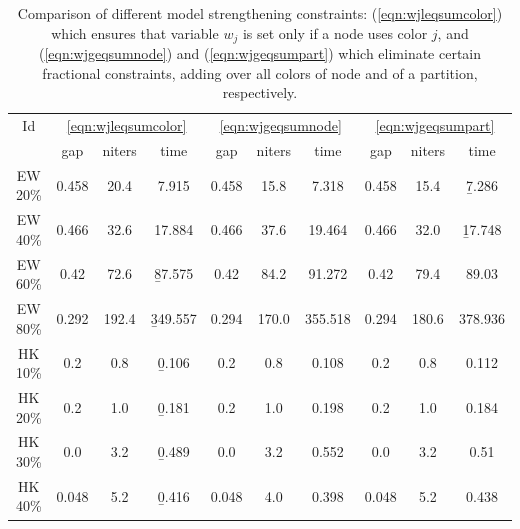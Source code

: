 \begin{table}
\label{table:models:colorbound}
\centering

\begin{tabular}{|c|ccc|ccc|ccc|}
\hline
\multicolumn{1}{|c|}{Id} & \multicolumn{3}{|c|}{\ref{eqn:wjleqsumcolor}} & \multicolumn{3}{|c|}{\ref{eqn:wjgeqsumnode}} & \multicolumn{3}{|c|}{\ref{eqn:wjgeqsumpart}}
\\
 & gap & niters & time & gap & niters & time & gap & niters & time
\\
\hline
EW 20\% & 0.458 & 20.4 & 7.915 & 0.458 & 15.8 & 7.318 & 0.458 & 15.4 & \b{7.286}
\\
EW 40\% & 0.466 & 32.6 & 17.884 & 0.466 & 37.6 & 19.464 & 0.466 & 32.0 & \b{17.748}
\\
EW 60\% & 0.42 & 72.6 & \b{87.575} & 0.42 & 84.2 & 91.272 & 0.42 & 79.4 & 89.03
\\
EW 80\% & 0.292 & 192.4 & \b{349.557} & 0.294 & 170.0 & 355.518 & 0.294 & 180.6 & 378.936
\\
\hline
HK 10\% &  0.2 &  0.8 & \b{0.106} &  0.2 &  0.8 & 0.108 &  0.2 &  0.8 & 0.112
\\
HK 20\% &  0.2 &  1.0 & \b{0.181} &  0.2 &  1.0 & 0.198 &  0.2 &  1.0 & 0.184
\\
HK 30\% &  0.0 &  3.2 & \b{0.489} &  0.0 &  3.2 & 0.552 &  0.0 &  3.2 & 0.51
\\
HK 40\% & 0.048 &  5.2 & \b{0.416} & 0.048 &  4.0 & 0.398 & 0.048 &  5.2 & 0.438
\\
\hline 
 \end{tabular}

\caption{Comparison of different model strengthening constraints: (\ref{eqn:wjleqsumcolor}) which ensures that variable $w_j$ is set only if a node uses color $j$, and (\ref{eqn:wjgeqsumnode}) and (\ref{eqn:wjgeqsumpart}) which eliminate certain fractional constraints, adding over all colors of node and of a partition, respectively.}

\end{table}

